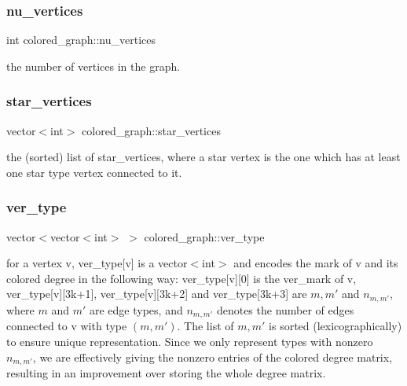 \mbox{\label{classcolored__graph_a90ece8eb1fec52f3f41549ab527c1d5b}} 
\subsubsection{\texorpdfstring{nu\+\_\+vertices}{nu\_vertices}}
{\footnotesize\ttfamily int colored\+\_\+graph\+::nu\+\_\+vertices}



the number of vertices in the graph. 

\mbox{\label{classcolored__graph_ab7ee8d717abde7ad7467ef695038f574}} 
\subsubsection{\texorpdfstring{star\+\_\+vertices}{star\_vertices}}
{\footnotesize\ttfamily vector$<$int$>$ colored\+\_\+graph\+::star\+\_\+vertices}



the (sorted) list of star\+\_\+vertices, where a star vertex is the one which has at least one star type vertex connected to it. 

\mbox{\label{classcolored__graph_a2cc32e7146fa3319f83cfa940f5e1be4}} 
\subsubsection{\texorpdfstring{ver\+\_\+type}{ver\_type}}
{\footnotesize\ttfamily vector$<$vector$<$int$>$ $>$ colored\+\_\+graph\+::ver\+\_\+type}



for a vertex v, ver\+\_\+type\mbox{[}v\mbox{]} is a vector$<$int$>$ and encodes the mark of v and its colored degree in the following way\+: ver\+\_\+type\mbox{[}v\mbox{]}\mbox{[}0\mbox{]} is the ver\+\_\+mark of v, ver\+\_\+type\mbox{[}v\mbox{]}\mbox{[}3k+1\mbox{]}, ver\+\_\+type\mbox{[}v\mbox{]}\mbox{[}3k+2\mbox{]} and ver\+\_\+type\mbox{[}3k+3\mbox{]} are $m, m'$ and $n_{m, m'}$, where $m$ and $m'$ are edge types, and $n_{m, m'}$ denotes the number of edges connected to v with type $(m, m')$. The list of $m, m'$ is sorted (lexicographically) to ensure unique representation. Since we only represent types with nonzero $n_{m, m'}$, we are effectively giving the nonzero entries of the colored degree matrix, resulting in an improvement over storing the whole degree matrix. 

